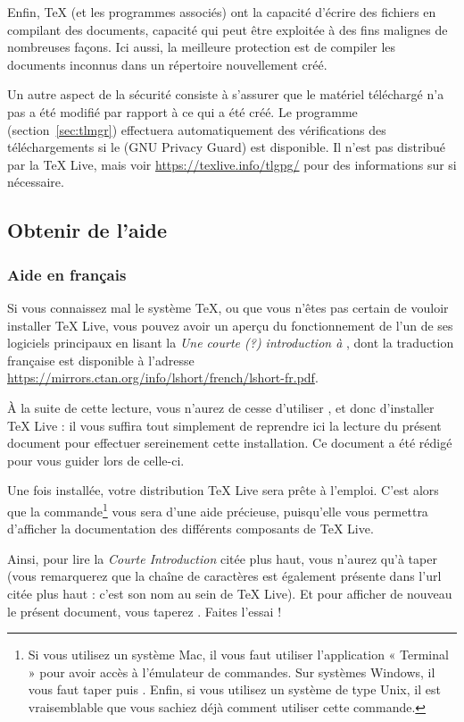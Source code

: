 \documentclass[german, english, french]{article}
\renewcommand{\TL}{\TeX{} Live\xspace}%
\begin{document}
Enfin, \TeX{} (et les programmes associés) ont la capacité d'écrire des fichiers
en compilant des documents, capacité qui peut être exploitée à des fins malignes
de nombreuses façons. Ici aussi, la meilleure protection est de compiler les
documents inconnus dans un répertoire nouvellement créé.

Un autre aspect de la sécurité consiste à s'assurer que le matériel téléchargé
n'a pas a été modifié par rapport à ce qui a été créé. Le programme 
(section~\ref{sec:tlmgr}) effectuera automatiquement des vérifications des
téléchargements si le  (GNU Privacy Guard) est disponible. Il n'est
pas distribué par la \TL, mais voir \url{https://texlive.info/tlgpg/} pour des
informations sur  si nécessaire.

\subsection{Obtenir de l'aide}
\label{sec:help}
\subsubsection{Aide en français}
Si vous connaissez mal le système \TeX{}, ou que vous n'êtes pas certain de
vouloir installer \TL{}, vous pouvez avoir un aperçu du fonctionnement de l'un
de ses logiciels principaux en lisant la \emph{Une courte (\string?)
  introduction à \LaTeXe{}}, dont la traduction française est disponible
à l'adresse \url{https://mirrors.ctan.org/info/lshort/french/lshort-fr.pdf}.

À la suite de cette lecture, vous n'aurez de cesse d'utiliser \LaTeXe{}, et donc
d'installer \TL{} : il vous suffira tout simplement de reprendre ici la lecture
du présent document pour effectuer sereinement cette installation.  Ce document
a été rédigé pour vous guider lors de celle-ci.

Une fois installée, votre distribution \TL{} sera prête à l'emploi.  C'est alors
que la commande\footnote{Si vous utilisez un système Mac, il vous faut utiliser
  l'application « Terminal » pour avoir accès à l'émulateur de commandes.  Sur
  systèmes Windows, il vous faut taper  puis .  Enfin, si
  vous utilisez un système de type Unix, il est vraisemblable que vous sachiez
  déjà comment utiliser cette commande.}  vous sera d'une aide
précieuse, puisqu'elle vous permettra d'afficher la documentation des différents
composants de \TL{}.

Ainsi, pour lire la \emph{Courte Introduction} citée plus haut, vous n'aurez
qu'à taper  (vous remarquerez que la chaîne de caractères
 est également présente dans l'url citée plus haut : c'est son
nom au sein de \TL{}).  Et pour afficher de nouveau le présent document, vous
taperez . Faites l'essai !
\end{document}
